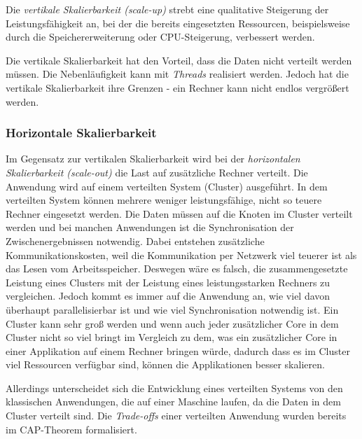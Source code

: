 Die \textit{vertikale Skalierbarkeit (scale-up)} strebt eine qualitative Steigerung der Leistungsfähigkeit an, bei der die bereits eingesetzten Ressourcen, beispielsweise durch die Speichererweiterung oder CPU-Steigerung, verbessert werden.

Die vertikale Skalierbarkeit hat den Vorteil, dass die Daten nicht verteilt werden müssen. Die Nebenläufigkeit kann mit \textit{Threads} realisiert werden. Jedoch hat die vertikale Skalierbarkeit ihre Grenzen - ein Rechner kann nicht endlos vergrößert werden. 

\subsubsection{Horizontale Skalierbarkeit}

Im Gegensatz zur vertikalen Skalierbarkeit wird bei der \textit{horizontalen Skalierbarkeit (scale-out)} die Last auf zusätzliche Rechner verteilt. Die Anwendung wird auf einem verteilten System (Cluster) ausgeführt. In dem verteilten System können mehrere weniger leistungsfähige, nicht so teuere Rechner eingesetzt werden. Die Daten müssen auf die Knoten im Cluster verteilt werden und bei manchen Anwendungen ist die Synchronisation der Zwischenergebnissen notwendig. Dabei entstehen zusätzliche Kommunikationskosten, weil die Kommunikation per Netzwerk viel teuerer ist als das Lesen vom Arbeitsspeicher. Deswegen wäre es falsch, die zusammengesetzte Leistung eines Clusters mit der Leistung eines leistungsstarken Rechners zu vergleichen. Jedoch kommt es immer auf die Anwendung an, wie viel davon überhaupt parallelisierbar ist und wie viel Synchronisation notwendig ist. Ein Cluster kann sehr groß werden und wenn auch jeder zusätzlicher Core in dem Cluster nicht so viel bringt im Vergleich zu dem, was ein zusätzlicher Core in einer Applikation auf einem Rechner bringen würde, dadurch dass es im Cluster viel Ressourcen verfügbar sind, können die Applikationen besser skalieren.

Allerdings unterscheidet sich die Entwicklung eines verteilten Systems von den klassischen Anwendungen, die auf einer Maschine laufen, da die Daten in dem Cluster verteilt sind. Die \textit{Trade-offs} einer verteilten Anwendung wurden bereits im CAP-Theorem formalisiert.

